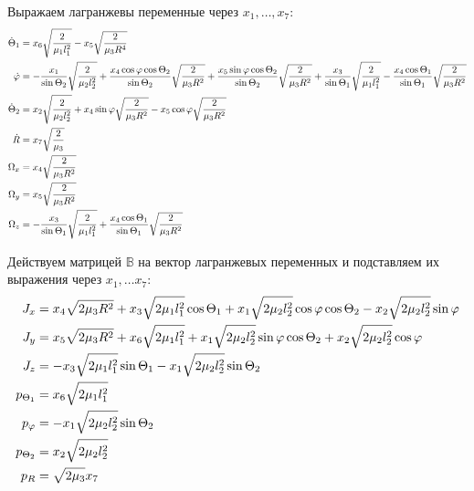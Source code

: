 \documentclass[12pt]{article}
\newcommand{\bbB}{\mathbb{B}}
\newcommand{\dR}{\dot{R}}
\newcommand{\dtone}{\dot{\Theta}_1}
\newcommand{\dttwo}{\dot{\Theta}_2}
\newcommand{\dphi}{\dot{\varphi}}
\newcommand{\ptone}{p_{\Theta_1}}
\newcommand{\pttwo}{p_{\Theta_2}}
\newcommand{\pphi}{p_{\varphi}}
\begin{document}
Выражаем лагранжевы переменные через $x_1, \dots, x_7$:
\begin{gather}
	\begin{aligned}
			\dtone &= x_6 \sqrt{\frac{2}{\mu_1 l_1^2}} - x_5 \sqrt{\frac{2}{\mu_3 R^4}} \\ 
		\dphi &= - \frac{x_1}{\sin \Theta_2} \sqrt{\frac{2}{\mu_2 l_2^2}} + \frac{x_4 \cos \varphi \cos \Theta_2}{\sin \Theta_2} \sqrt{\frac{2}{\mu_3 R^2}} + \frac{x_5 \sin \varphi \cos \Theta_2}{\sin \Theta_2} \sqrt{\frac{2}{\mu_3 R^2}} + \frac{x_3}{\sin \Theta_1} \sqrt{\frac{2}{\mu_1 l_1^2}}
	- \frac{x_4 \cos \Theta_1}{\sin \Theta_1} \sqrt{\frac{2}{\mu_3 R^2}} \\
	\dttwo &= x_2 \sqrt{\frac{2}{\mu_2 l_2^2}} + x_4 \sin \varphi \sqrt{\frac{2}{\mu_3 R^2}} - x_5 \cos \varphi \sqrt{\frac{2}{\mu_3 R^2}} \\
	\dR &= x_7 \sqrt{\frac{2}{\mu_3}} \\
	\Omega_x &= x_4 \sqrt{\frac{2}{\mu_3 R^2}} \\
	\Omega_y &= x_5 \sqrt{\frac{2}{\mu_3 R^2}} \\
	\Omega_z &= - \frac{x_3}{\sin \Theta_1} \sqrt{\frac{2}{\mu_1 l_1^2}} + \frac{x_4 \cos \Theta_1}{\sin \Theta_1} \sqrt{\frac{2}{\mu_3 R^2}}
	\end{aligned} \notag
\end{gather}

Действуем матрицей $\bbB$ на вектор лагранжевых переменных и подставляем их выражения через $x_1, \dots x_7$:
\begin{gather}
	\begin{aligned}
		J_x &= x_4 \sqrt{2 \mu_3 R^2} + x_3 \sqrt{2 \mu_1 l_1^2} \cos \Theta_1 + x_1 \sqrt{2 \mu_2 l_2^2} \cos \varphi \cos \Theta_2 - x_2 \sqrt{2 \mu_2 l_2^2} \sin \varphi \\
		J_y &= x_5 \sqrt{2 \mu_3 R^2} + x_6 \sqrt{2 \mu_1 l_1^2} + x_1 \sqrt{2 \mu_2 l_2^2} \sin \varphi \cos \Theta_2 + x_2 \sqrt{2 \mu_2 l_2^2} \cos \varphi\\
		J_z &= - x_3 \sqrt{2 \mu_1 l_1^2} \sin \Theta_1 - x_1 \sqrt{2 \mu_2 l_2^2} \sin \Theta_2 \\
		\ptone &= x_6 \sqrt{2 \mu_1 l_1^2} \\
		\pphi &= - x_1 \sqrt{2 \mu_2 l_2^2} \sin \Theta_2 \\
		\pttwo &= x_2 \sqrt{2 \mu_2 l_2^2} \\
		p_R &= \sqrt{2 \mu_3} x_7
	\end{aligned} \notag
\end{gather}
\end{document}
